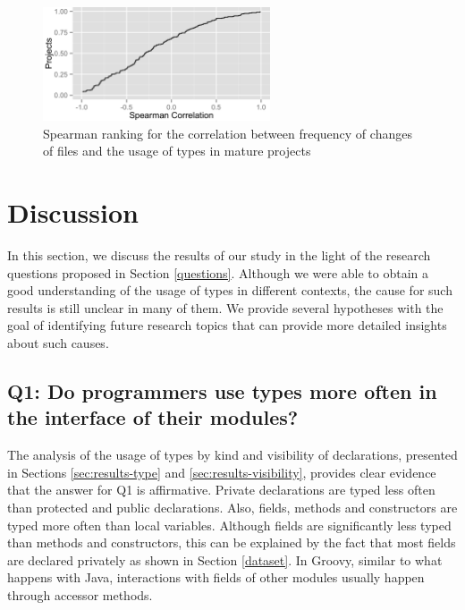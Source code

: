 \documentclass[msc]{ppgccufmg}
\begin{document}
\begin{figure}[h]
\centering \includegraphics[width=0.6\textwidth]{../aosd_2014/analysis/result/change_commits_distribution.png} 
\caption{Spearman ranking for the correlation between frequency of changes of files and the usage of types in mature projects}
\label{fig:change_spearman} 
\end{figure}
















%
%
\chapter{Discussion\label{discussion}}
In this section, we discuss the results of our study in the light of the research questions proposed in Section \ref{questions}.
Although we were able to obtain a good understanding of the usage of types in different contexts, the cause for such results is still unclear in many of them.
We provide several hypotheses with the goal of identifying future research topics that can provide more detailed insights about such causes.

\section*{Q1: Do programmers use types more often in the interface of their modules?\label{discussion-q1}}
The analysis of the usage of types by kind and visibility of declarations, presented in Sections \ref{sec:results-type} and \ref{sec:results-visibility}, provides clear evidence that the answer for Q1 is affirmative.
Private declarations are typed less often than protected and public declarations.
Also, fields, methods and constructors are typed more often than local variables.
Although fields are significantly less typed than methods and constructors, this can be explained by the fact that most fields are declared privately as shown in Section \ref{dataset}.
In Groovy, similar to what happens with Java, interactions with fields of other modules usually happen through accessor methods.
\end{document}
